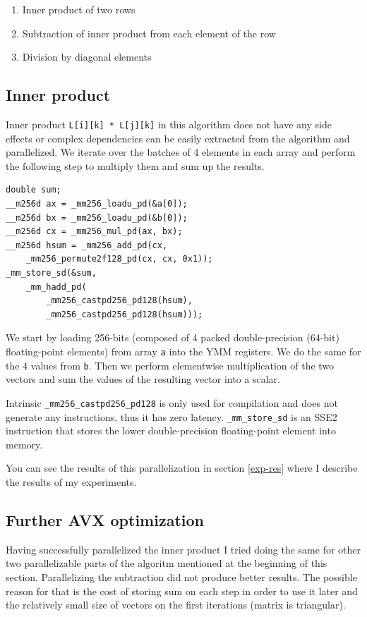 \documentclass[sigplan]{acmart}
\begin{document}
\begin{enumerate}
\item Inner product of two rows
\item Subtraction of inner product from each element of the row
\item Division by diagonal elements
\end{enumerate}

\subsection{Inner product}

Inner product \texttt{L[i][k] * L[j][k]} in this algorithm does not have any side effects or complex dependencies can be easily extracted from the algorithm and parallelized. We iterate over the batches of 4 elements in each array and perform the following step to multiply them and sum up the results.

\lstset {language=C++}
\begin{lstlisting}
double sum;
__m256d ax = _mm256_loadu_pd(&a[0]);
__m256d bx = _mm256_loadu_pd(&b[0]);
__m256d cx = _mm256_mul_pd(ax, bx);
__m256d hsum = _mm256_add_pd(cx,
    _mm256_permute2f128_pd(cx, cx, 0x1));
_mm_store_sd(&sum,
    _mm_hadd_pd(
        _mm256_castpd256_pd128(hsum),
        _mm256_castpd256_pd128(hsum)));
\end{lstlisting}

We start by loading 256-bits (composed of 4 packed double-precision (64-bit) floating-point elements) from array \texttt{a} into the YMM registers. We do the same for the 4 values from \texttt{b}. Then we perform elementwise multiplication of the two vectors and sum the values of the resulting vector into a scalar.

Intrinsic \texttt{\_mm256\_castpd256\_pd128} is only used for compilation and does not generate any instructions, thus it has zero latency. \texttt{\_mm\_store\_sd} is an SSE2 instruction that stores the lower double-precision floating-point element into memory.

You can see the results of this parallelization in section \ref{exp-res} where I describe the results of my experiments.

\subsection{Further AVX optimization}

Having successfully parallelized the inner product I tried doing the same for other two parallelizable parts of the algoritm mentioned at the beginning of this section. Parallelizing the subtraction did not produce better results. The possible reason for that is the cost of storing sum on each step in order to use it later and the relatively small size of vectors on the first iterations (matrix is triangular).
\end{document}
